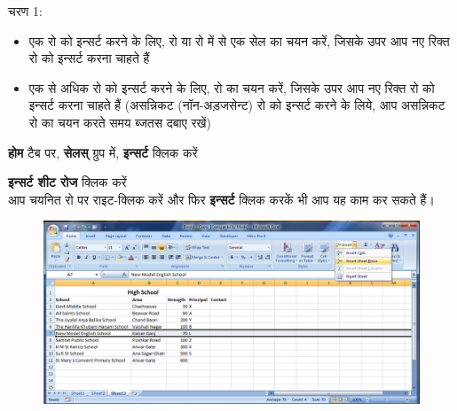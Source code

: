 \begin{descriptionSimple}{चरण 1:}
\item[चरण 1]
		\begin{itemize}
		\item एक रो को इन्सर्ट करने के लिए, रो या रो में से एक सेल का चयन करें, जिसके उपर आप नए रिक्त रो को इन्सर्ट करना चाहते हैं
		\item एक से अधिक रो को इन्सर्ट करने के लिए, रो का चयन करें, जिसके उपर आप नए रिक्त रो को इन्सर्ट करना चाहते हैं (असन्निकट (नॉन-अड़जसेन्ट) रो को इन्सर्ट करने के लिये, आप असन्निकट रो का चयन करते समय ब्जतस दबाए रखें)		\end{itemize}
\item[चरण 2] \textbf{होम} टैब पर, \textbf{सेलस्} ग्रुप में, \textbf{इन्सर्ट} क्लिक करें
\item[चरण 3] \textbf{इन्सर्ट शीट रोज} क्लिक करें\\ आप चयनित रो पर राइट-क्लिक करें और फिर \textbf{इन्सर्ट} क्लिक करकें भी आप यह काम कर सकते हैं।
\end{descriptionSimple}
\begin{figure}[H]
\centering
\includegraphics[scale=0.33]{src/images/chapter1/chapter1_fig31.png}
\end{figure}

